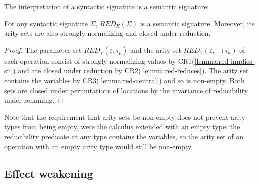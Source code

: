 \documentclass[acmsmall, screen, review, anonymous]{acmart}
\theoremstyle{definition}
\newcommand{\glob}{\mathop{\Box}}
\newcommand{\cempty}{\varepsilon}
\newcommand{\redname}{RED}
\newcommand{\redvname}{\redname_{V}}
\newcommand{\redv}[2]{\redvname{({#1},{#2})}}
\newcommand{\redsigname}{\redname_{E}}
\newcommand{\redsig}[1]{\redsigname{(#1)}}
\begin{document}
The interpretation of a syntactic signature is a semantic signature:
\begin{lemma}
\label{lemma:red-sig}
For any syntactic signature $\Sigma$, $\redsig{\Sigma}$ is a semantic
signature. Moreover, its arity sets are also strongly normalizing and
closed under reduction.
\end{lemma}
\begin{proof}
  The parameter set $\redv{\cempty}{\tau_p}$ and the arity set
  $\redv{\cempty}{\glob \tau_a}$ of each operation consist of strongly
  normalizing values by CR1(\ref{lemma:red-implies-sn}) and are closed
  under reduction by CR2(\ref{lemma:red-reduces}). The arity set
  contains the variables by CR3(\ref{lemma:red-neutral}) and so is
  non-empty. Both sets are closed under permutations of locations by
  the invariance of reducibility under renaming.
\end{proof}
Note that the requirement that arity sets be non-empty does not
prevent arity types from being empty, were the calculus extended
with an empty type: the reducibility predicate at any type contains
the variables, so the arity set of an operation with an empty arity
type would still be non-empty.

\subsection{Effect weakening}
\end{document}
